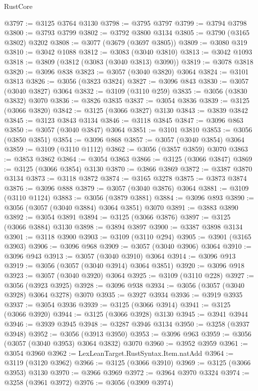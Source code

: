 \begin{lexlean}{RustCore}
\begin{coremodule}
@3797 := @3125 @3764 @3130
@3798 := @3795 @3797
@3799 := @3794 @3798
@3800 := @3793 @3799
@3802 := @3792 @3800 @3134
@3805 := @3790 (@3165 @3802) @3202
@3808 := @3077 (@3679 (@3697 @3805))
@3809 := @3080 @319
@3810 := @3042 @1088
@3812 := @3083 (@3040 @3810)
@3813 := @3042 @1093
@3818 := @3809 (@3812 (@3083 (@3040 @3813) @3090))
@3819 := @3078 @3818
@3820 := @3096 @838
@3823 := @3057 (@3040 @3820) @3064
@3824 := @3101 @3813
@3826 := @3056 (@3823 @3824)
@3827 := @3096 @843
@3830 := @3057 (@3040 @3827) @3064
@3832 := @3109 (@3110 @259)
@3835 := @3056 (@3830 @3832) @3070
@3836 := @3826 @3835
@3837 := @3054 @3836
@3839 := @3125 (@3066 @3820)
@3842 := @3125 (@3066 @3827) @3130
@3843 := @3839 @3842
@3845 := @3123 @3843 @3134
@3846 := @3118 @3845
@3847 := @3096 @863
@3850 := @3057 (@3040 @3847) @3064
@3851 := @3101 @3810
@3853 := @3056 (@3850 @3851)
@3854 := @3096 @868
@3857 := @3057 (@3040 @3854) @3064
@3859 := @3109 (@3110 @1112)
@3862 := @3056 (@3857 @3859) @3070
@3863 := @3853 @3862
@3864 := @3054 @3863
@3866 := @3125 (@3066 @3847)
@3869 := @3125 (@3066 @3854) @3130
@3870 := @3866 @3869
@3872 := @3387 @3870 @3134
@3873 := @3118 @3872
@3874 := @3165 @3278
@3875 := @3873 @3874
@3876 := @3096 @888
@3879 := @3057 (@3040 @3876) @3064
@3881 := @3109 (@3110 @1124)
@3883 := @3056 (@3879 @3881)
@3884 := @3096 @893
@3890 := @3056 (@3057 (@3040 @3884) @3064 @3851) @3070
@3891 := @3883 @3890
@3892 := @3054 @3891
@3894 := @3125 (@3066 @3876)
@3897 := @3125 (@3066 @3884) @3130
@3898 := @3894 @3897
@3900 := @3387 @3898 @3134
@3901 := @3118 @3900
@3903 := @3109 (@3110 @294)
@3905 := @3901 (@3165 @3903)
@3906 := @3096 @968
@3909 := @3057 (@3040 @3906) @3064
@3910 := @3096 @943
@3913 := @3057 (@3040 @3910) @3064
@3914 := @3096 @913
@3919 := @3056 (@3057 (@3040 @3914) @3064 @3851)
@3920 := @3096 @918
@3923 := @3057 (@3040 @3920) @3064
@3925 := @3109 (@3110 @228)
@3927 := @3056 (@3923 @3925)
@3928 := @3096 @938
@3934 := @3056 (@3057 (@3040 @3928) @3064 @3278) @3070
@3935 := @3927 @3934
@3936 := @3919 @3935
@3937 := @3054 @3936
@3939 := @3125 (@3066 @3914)
@3941 := @3125 (@3066 @3920)
@3944 := @3125 (@3066 @3928) @3130
@3945 := @3941 @3944
@3946 := @3939 @3945
@3948 := @3287 @3946 @3134
@3950 := @3258 (@3937 @3948)
@3952 := @3056 (@3913 @3950)
@3953 := @3096 @963
@3959 := @3056 (@3057 (@3040 @3953) @3064 @3832) @3070
@3960 := @3952 @3959
@3961 := @3054 @3960
@3962 := LexLeanTarget.RustSyntax.Item.natAdd
@3964 := @3119 (@3120 @3962)
@3966 := @3125 (@3066 @3910)
@3969 := @3125 (@3066 @3953) @3130
@3970 := @3966 @3969
@3972 := @3964 @3970 @3324
@3974 := @3258 (@3961 @3972)
@3976 := @3056 (@3909 @3974)

\end{coremodule}
\end{lexlean}
